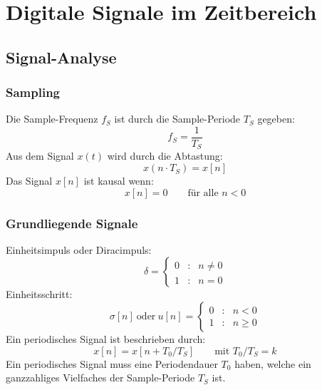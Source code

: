 



\chapter{Digitale Signale im Zeitbereich}
\section{Signal-Analyse}
\subsection{Sampling}
Die Sample-Frequenz $f_S$ ist durch die Sample-Periode
$T_S$ gegeben:
\[ f_S = \frac{1}{T_S} \]
Aus dem Signal $x(t)$ wird durch die Abtastung:
\[ x(n\cdot T_S) = x[n]\]
Das Signal $x[n]$ ist kausal wenn:
\[ x[n] = 0 \qquad \textrm{für alle } n < 0 \]

\subsection{Grundliegende Signale}
Einheitsimpuls oder Diracimpuls:
\[
	\delta = \left\lbrace \begin{matrix}
		0 & : & n \neq 0 \\
		1 & : & n = 0
	\end{matrix} \right.
\]
Einheitsschritt:
\[
	\sigma[n] \mathrm{\ oder\ } u[n] = \left\lbrace \begin{matrix}
		0 & : & n < 0 \\
		1 & : & n \geq 0
	\end{matrix} \right.
\]
Ein periodisches Signal ist beschrieben durch:
\[ x[n] = x[n + T_0/T_S] \qquad \textrm{mit } T_0/T_S = k \]
Ein periodisches Signal muss eine Periodendauer $T_0$ haben,
welche ein ganzzahliges Vielfaches der Sample-Periode $T_S$ ist. 

